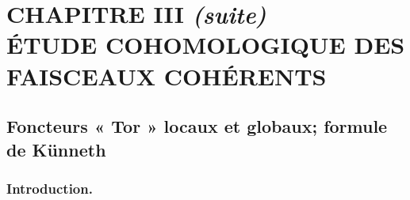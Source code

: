 \chapter*{CHAPITRE III \emph{(suite)}\\[1.2ex]
\Large ÉTUDE COHOMOLOGIQUE DES FAISCEAUX COHÉRENTS}


\section{Foncteurs « Tor » locaux et globaux; formule de Künneth}
\label{section:III.6.fr}

\subsection{Introduction.}
\label{subsection:III.6.1.fr}

